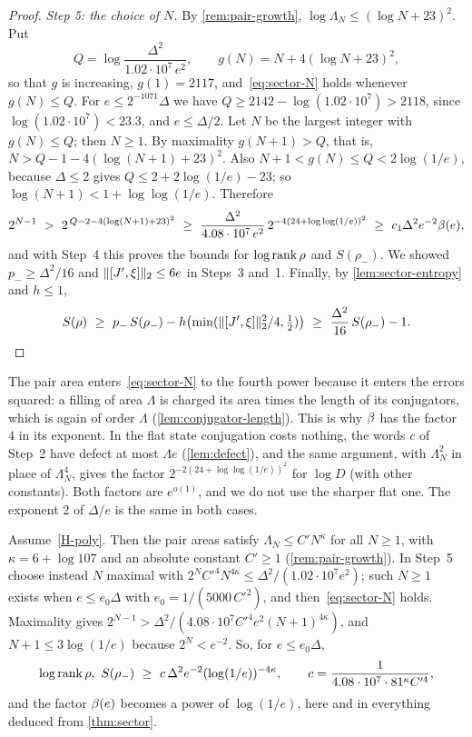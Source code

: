 \begin{proof}
\emph{Step 5: the choice of $N$.} By \cref{rem:pair-growth}, $\log\Lambda_N\le(\log N+23)^2$. Put
\[
Q=\log\frac{\Delta^2}{1.02\cdot10^7\,e^2},\qquad g(N)=N+4(\log N+23)^2 ,
\]
so that $g$ is increasing, $g(1)=2117$, and~\eqref{eq:sector-N} holds whenever $g(N)\le Q$. For $e\le2^{-1071}\Delta$ we have
$Q\ge2142-\log(1.02\cdot10^7)>2118$, since $\log(1.02\cdot10^7)<23.3$, and $e\le\Delta/2$. Let $N$ be the largest integer with $g(N)\le Q$;
then $N\ge1$. By maximality $g(N+1)>Q$, that is, $N>Q-1-4(\log(N+1)+23)^2$. Also $N+1<g(N)\le Q<2\log(1/e)$, because $\Delta\le2$ gives
$Q\le2+2\log(1/e)-23$; so $\log(N+1)<1+\log\log(1/e)$. Therefore
\[
2^{N-1}\ >\ 2^{\,Q-2-4(\log(N+1)+23)^2}\ \ge\ \frac{\Delta^2}{4.08\cdot10^7\,e^2}\,2^{-4(24+\log\log(1/e))^2}\ \ge\ c_1\Delta^2e^{-2}\bfun(e),
\]
and with Step~4 this proves the bounds for $\log\operatorname{rank}\rho$ and $S(\rho_-)$. We showed $p_-\ge\Delta^2/16$ and $\lVert [J',\xi]\rVert_2\le6e$ in Steps~3
and~1. Finally, by \cref{lem:sector-entropy} and $h\le1$,
\[
S(\rho)\ \ge\ p_-\,S(\rho_-)-h\bigl(\min(\hs{[J',\xi]}^2/4,\tfrac12)\bigr)\ \ge\ \frac{\Delta^2}{16}\,S(\rho_-)-1. \qedhere
\]
\end{proof}

\begin{remark}\label{sector:rem-exponent}
The pair area enters~\eqref{eq:sector-N} to the fourth power because it enters the errors squared: a filling of area $\Lambda$ is charged
its area times the length of its conjugators, which is again of order $\Lambda$ (\cref{lem:conjugator-length}). This is why $\beta$ has
the factor $4$ in its exponent. In the flat state conjugation costs nothing, the words $c$ of Step~2 have defect at most $\Lambda e$
(\cref{lem:defect}), and the same argument, with $\Lambda_N^2$ in place of $\Lambda_N^4$, gives the factor $2^{-2(24+\log\log(1/e))^2}$ for
$\log D$ (with other constants). Both factors are $e^{o(1)}$, and we do not use the sharper flat one. The exponent $2$ of $\Delta/e$ is the
same in both cases.
\end{remark}

\begin{remark}\label{rem:sector-poly}
Assume~\ref{H-poly}. Then the pair areas satisfy $\Lambda_N\le C'N^\kappa$ for all $N\ge1$, with $\kappa=6+\log107$ and an absolute
constant $C'\ge1$ (\cref{rem:pair-growth}). In Step~5 choose instead $N$ maximal with $2^NC'^4N^{4\kappa}\le\Delta^2/(1.02\cdot10^7e^2)$;
such $N\ge1$ exists when $e\le e_0\Delta$ with $e_0=1/(5000\,C'^2)$, and then~\eqref{eq:sector-N} holds. Maximality gives
$2^{N-1}>\Delta^2/(4.08\cdot10^7C'^4e^2(N+1)^{4\kappa})$, and $N+1\le3\log(1/e)$ because $2^N<e^{-2}$. So, for $e\le e_0\Delta$,
\[
\log\rank\rho,\ S(\rho_-)\ \ge\ c\,\Delta^2e^{-2}(\log(1/e))^{-4\kappa},\qquad c=\frac1{4.08\cdot10^7\cdot81^{\kappa}C'^4},
\]
and the factor $\beta(e)$ becomes a power of $\log(1/e)$, here and in everything deduced from \cref{thm:sector}.
\end{remark}

